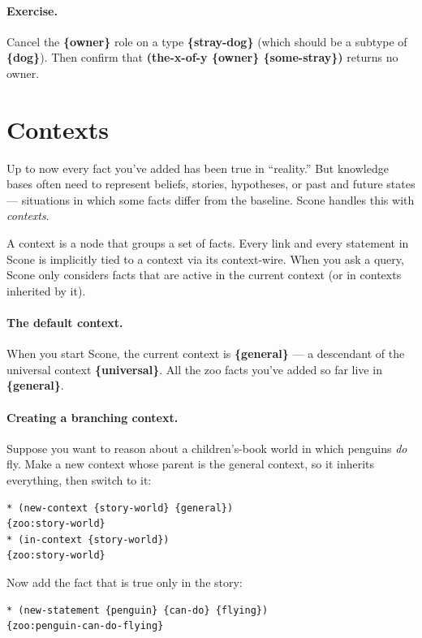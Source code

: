 \documentclass[titlepage,twoside,openright,11pt]{article}
\begin{document}
\paragraph{Exercise.}
Cancel the \textbf{\{owner\}} role on a type \textbf{\{stray-dog\}}
(which should be a subtype of \textbf{\{dog\}}). Then confirm that
\textbf{(the-x-of-y \{owner\} \{some-stray\})} returns no owner.

\section{Contexts}\label{contexts}

Up to now every fact you've added has been true in ``reality.''
But knowledge bases often need to represent beliefs, stories,
hypotheses, or past and future states --- situations in which some
facts differ from the baseline. Scone handles this with \emph{contexts}.

A context is a node that groups a set of facts. Every link and
every statement in Scone is implicitly tied to a context via its
context-wire. When you ask a query, Scone only considers facts that
are active in the current context (or in contexts inherited by it).

\paragraph{The default context.}
When you start Scone, the current context is \textbf{\{general\}}
--- a descendant of the universal context \textbf{\{universal\}}.
All the zoo facts you've added so far live in \textbf{\{general\}}.

\paragraph{Creating a branching context.}
Suppose you want to reason about a children's-book world in which
penguins \emph{do} fly. Make a new context whose parent is the
general context, so it inherits everything, then switch to it:

\begin{verbatim}
* (new-context {story-world} {general})
{zoo:story-world}
* (in-context {story-world})
{zoo:story-world}
\end{verbatim}

Now add the fact that is true only in the story:

\begin{verbatim}
* (new-statement {penguin} {can-do} {flying})
{zoo:penguin-can-do-flying}
\end{verbatim}
\end{document}
